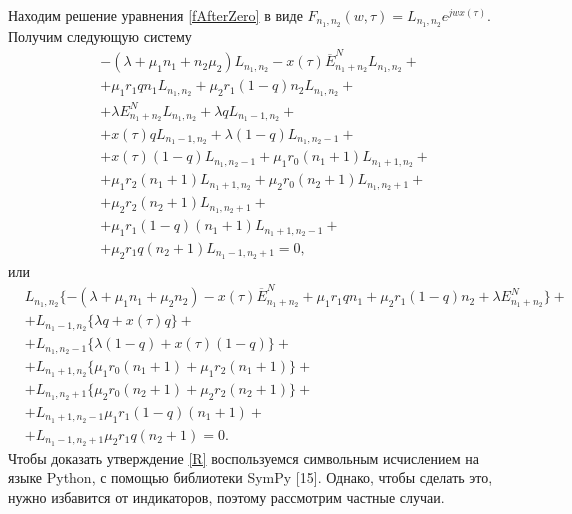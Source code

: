 Находим решение уравнения \eqref{fAfterZero} в виде $F_{n_{1}, n_{2}}(w,\tau)=L_{n_{1}, n_{2}}e^{jwx(\tau)}$. Получим следующую систему\\
\begin{equation*}
	\begin{split}
		&-(\lambda+\mu_{1}n_{1}+n_{2}\mu_{2})L_{n_{1}, n_{2}} 
		- x(\tau)\overline{E}_{n_{1}+n_{2}}^N L_{n_{1}, n_{2}}+\\
		&+ \mu_{1}r_{1}qn_{1}L_{n_{1}, n_{2}}+ \mu_{2}r_{1}(1-q)n_{2}L_{n_{1}, n_{2}}+\\
		&+ \lambda  E_{n_{1}+n_{2}}^N L_{n_{1}, n_{2}}+\lambda qL_{n_{1}-1, n_{2}}+\\
		&+ x(\tau) q  L_{n_{1}-1, n_{2}}+\lambda (1-q)L_{n_{1}, n_{2}-1} +\\
		&+ x(\tau) (1-q) L_{n_{1}, n_{2}-1}+ \mu_{1} r_{0} (n_{1}+1)L_{n_{1} +1 , n_{2}} +\\
		&+ \mu_{1} r_{2} (n_{1}+1) L_{n_{1} + 1, n_{2}}+ \mu_{2} r_{0} (n_{2}+1)L_{n_{1}, n_{2} + 1 }+\\
		& + \mu_{2} r_{2} (n_{2}+1) L_{n_{1}, n_{2} + 1}+\\
		&+\mu_{1} r_{1}(1-q)(n_{1}+1) L_{n_{1} +1 , n_{2}-1}+\\
		&+\mu_{2} r_{1}q (n_{2}+1)L_{n_{1} -1 , n_{2}+1}=0,
	\end{split}
\end{equation*}
или
\begin{equation}\label{sistForR}
	\begin{split}
		&L_{n_{1}, n_{2}}\{-(\lambda+\mu_{1}n_{1}+\mu_{2}n_{2}) - x(\tau)\overline{E}_{n_{1}+n_{2}}^N+ \mu_{1}r_{1}qn_{1}+ \mu_{2}r_{1}(1-q)n_{2}+ \lambda  E_{n_{1}+n_{2}}^N\}+\\
		&+L_{n_{1}-1, n_{2}}\{\lambda q+ x(\tau) q  \}+\\
		&+L_{n_{1}, n_{2}-1}\{\lambda (1-q) + x(\tau) (1-q) \}+\\
		&+L_{n_{1} +1 , n_{2}}\{ \mu_{1} r_{0}(n_{1}+1) + \mu_{1} r_{2} (n_{1}+1)\}+\\
		&+L_{n_{1}, n_{2} + 1 }\{ \mu_{2} r_{0} (n_{2}+1) + \mu_{2} r_{2} (n_{2}+1) \}+\\
		&+ L_{n_{1} +1 , n_{2}-1}\mu_{1} r_{1}(1-q)(n_{1}+1)+\\
		&+L_{n_{1} -1 , n_{2}+1}\mu_{2} r_{1}q(n_{2}+1) =0.
	\end{split}
\end{equation}
Чтобы доказать утверждение \eqref{R} воспользуемся символьным исчислением на языке Python, с помощью библиотеки SymPy [15]. Однако, чтобы сделать это, нужно избавится от индикаторов, поэтому рассмотрим частные случаи.\\

